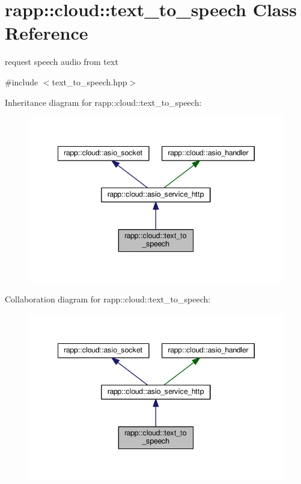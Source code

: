 \hypertarget{classrapp_1_1cloud_1_1text__to__speech}{\section{rapp\-:\-:cloud\-:\-:text\-\_\-to\-\_\-speech Class Reference}
\label{classrapp_1_1cloud_1_1text__to__speech}
}


request speech audio from text  




{\ttfamily \#include $<$text\-\_\-to\-\_\-speech.\-hpp$>$}



Inheritance diagram for rapp\-:\-:cloud\-:\-:text\-\_\-to\-\_\-speech\-:
\nopagebreak
\begin{figure}[H]
\begin{center}
\leavevmode
\includegraphics[width=345pt]{classrapp_1_1cloud_1_1text__to__speech__inherit__graph}
\end{center}
\end{figure}


Collaboration diagram for rapp\-:\-:cloud\-:\-:text\-\_\-to\-\_\-speech\-:
\nopagebreak
\begin{figure}[H]
\begin{center}
\leavevmode
\includegraphics[width=345pt]{classrapp_1_1cloud_1_1text__to__speech__coll__graph}
\end{center}
\end{figure}

